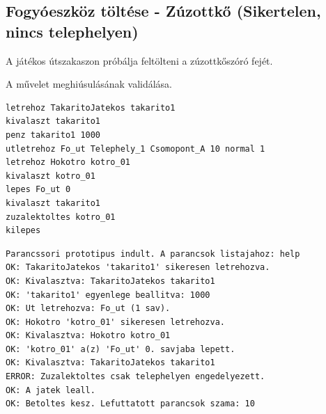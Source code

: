 \subsection{Fogyóeszköz töltése - Zúzottkő (Sikertelen, nincs telephelyen)}
\begin{test-case-description}
    A játékos útszakaszon próbálja feltölteni a zúzottkőszóró fejét.
\end{test-case-description}
\begin{test-case-function}
    A művelet meghiúsulásának validálása.
\end{test-case-function}
\begin{test-case-input}
\begin{verbatim}
letrehoz TakaritoJatekos takarito1
kivalaszt takarito1
penz takarito1 1000
utletrehoz Fo_ut Telephely_1 Csomopont_A 10 normal 1
letrehoz Hokotro kotro_01
kivalaszt kotro_01
lepes Fo_ut 0
kivalaszt takarito1
zuzalektoltes kotro_01
kilepes
\end{verbatim}
\end{test-case-input}
\begin{test-case-output}
\begin{verbatim}
Parancssori prototipus indult. A parancsok listajahoz: help
OK: TakaritoJatekos 'takarito1' sikeresen letrehozva.
OK: Kivalasztva: TakaritoJatekos takarito1
OK: 'takarito1' egyenlege beallitva: 1000
OK: Ut letrehozva: Fo_ut (1 sav).
OK: Hokotro 'kotro_01' sikeresen letrehozva.
OK: Kivalasztva: Hokotro kotro_01
OK: 'kotro_01' a(z) 'Fo_ut' 0. savjaba lepett.
OK: Kivalasztva: TakaritoJatekos takarito1
ERROR: Zuzalektoltes csak telephelyen engedelyezett.
OK: A jatek leall.
OK: Betoltes kesz. Lefuttatott parancsok szama: 10
\end{verbatim}
\end{test-case-output}

